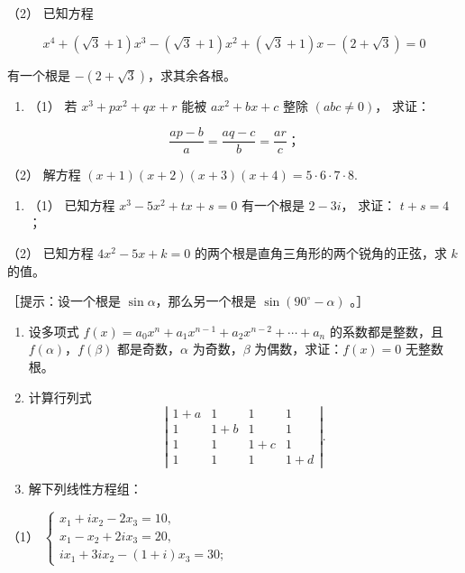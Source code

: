 （2） 已知方程

\[
x ^ {4} + (\sqrt {3} + 1) x ^ {3} - (\sqrt {3} + 1) x ^ {2} + (\sqrt {3} + 1) x - (2 + \sqrt {3}) = 0
\]

有一个根是 \(-(2+\sqrt{3})\)，求其余各根。

\begin{enumerate}[start=20]
\item
  （1） 若 \(x^{3} + px^{2} + qx + r\) 能被 \(ax^{2} + bx + c\) 整除
  \((abc \neq 0)\)， 求证：
\end{enumerate}

\[
\frac {a p - b}{a} = \frac {a q - c}{b} = \frac {a r}{c}\text{；}
\]

（2） 解方程 \((x+1)(x+2)(x+3)(x+4)=5\cdot6\cdot7\cdot8.\)

\begin{enumerate}[start=21]
\item
  （1） 已知方程 \(x^{3} - 5x^{2} + tx + s = 0\) 有一个根是 \(2 - 3i\)，
  求证： \(t + s = 4\)；
\end{enumerate}

（2） 已知方程 \(4x^{2} - 5x + k = 0\)
的两个根是直角三角形的两个锐角的正弦，求 \(k\) 的值。

［提示：设一个根是 \(\sin \alpha\)，那么另一个根是
\(\sin (90^{\circ} - \alpha)\) 。］

\begin{enumerate}[start=22]
\item
  设多项式 \(f(x) = a_0 x^n + a_1 x^{n-1} + a_2 x^{n-2} + \cdots + a_n\)
  的系数都是整数，且 \(f(\alpha)\)，\(f(\beta)\) 都是奇数，\(\alpha\)
  为奇数，\(\beta\) 为偶数，求证：\(f(x) = 0\) 无整数根。
\item
  计算行列式
\[
\left| \begin{array}{cccc} 1 + a & 1 & 1 & 1 \\ 1 & 1 + b & 1 & 1 \\ 1 & 1 & 1 + c & 1 \\ 1 & 1 & 1 & 1 + d \end{array} \right|.
\]
\item
  解下列线性方程组：
\end{enumerate}

（1）
\(\left\{ \begin{array}{l} x_{1} + ix_{2} - 2x_{3} = 10, \\ x_{1} - x_{2} + 2ix_{3} = 20, \\ ix_{1} + 3ix_{2} - (1 + i)x_{3} = 30; \end{array} \right.\)

